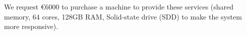 \begin{workpackage}
\begin{tasklist}
\begin{task}[title=Visualization system for 3d data in web-notebook
,id=vis3d,lead=SR, partners={US,PS,USO}]
\begin{task}[lead=USO,id=oommf-nb-ve,title=Online portal for
  micromagnetic VRE demonstrator,PM=3, partners={SR,JU}]
  We request \euro{6000} to purchase a machine to provide these
  services (shared memory, 64 cores, 128GB RAM, Solid-state drive (SDD)
  to make the system more responsive). 
\end{task}



%

\end{task}
\end{tasklist}
\end{workpackage}
